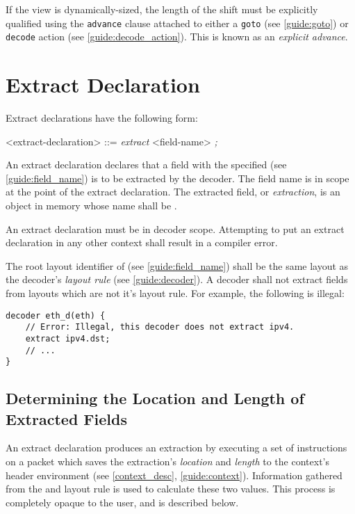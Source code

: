 If the view is dynamically-sized, the length of the shift must be explicitly qualified using the \texttt{\color{blue}advance} clause attached to either a \texttt{goto} (see \ref{guide:goto}) or \texttt{decode} action (see \ref{guide:decode_action}). This is known as an \textit{explicit advance}.

\section{Extract Declaration} \label{guide:extract}

Extract declarations have the following form:

\begin{grammar}
<extract-declaration> ::=
\textit{extract} <field-name> \textit{;}
\end{grammar}

An extract declaration declares that a field with the specified  (see \ref{guide:field_name}) is to be extracted by the decoder. The field name is in scope at the point of the extract declaration. The extracted field, or \textit{extraction}, is an object in memory whose name shall be .

An extract declaration must be in decoder scope. Attempting to put an extract declaration in any other context shall result in a compiler error.

The root layout identifier of  (see \ref{guide:field_name}) shall be the same layout as the decoder's \textit{layout rule} (see \ref{guide:decoder}). A decoder shall not extract fields from layouts which are not it's layout rule. For example, the following is illegal:

\begin{minip}
\begin{lstlisting}
decoder eth_d(eth) {
	// Error: Illegal, this decoder does not extract ipv4.
	extract ipv4.dst; 
	// ...
}
\end{lstlisting}
\end{minip}

\subsection{Determining the Location and Length of Extracted Fields}

An extract declaration produces an extraction by executing a set of instructions on a packet which saves the extraction's \textit{location} and \textit{length} to the context's header environment (see \ref{context_desc}, \ref{guide:context}). Information gathered from the  and layout rule is used to calculate these two values. This process is completely opaque to the user, and is described below.

